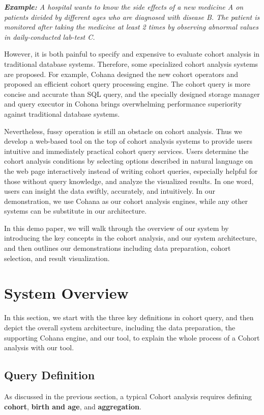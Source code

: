 \documentclass[10pt,conference,letterpaper]{IEEEtran}
\begin{document}
\emph{\textbf{Example:} A hospital wants to know the side effects of a new medicine A on patients divided by different ages who are diagnosed with disease B. The patient is monitored after taking the medicine at least 2 times by observing abnormal values in daily-conducted lab-test C.}

However, it is both painful to specify and expensive to evaluate cohort analysis in traditional database systems. Therefore, some specialized cohort analysis systems are proposed. For example, Cohana\cite{jiang2016cohort} designed the new cohort operators and proposed an efficient cohort query processing engine. The cohort query is more concise and accurate than SQL query, and the specially designed storage manager and query executor in Cohona brings overwhelming performance superiority against traditional database systems. 

Nevertheless, fussy operation is still an obstacle on cohort analysis. Thus we develop a web-based tool on the top of cohort analysis systems to provide users intuitive and immediately practical cohort query services. Users determine the cohort analysis conditions by selecting options described in natural language on the web page interactively instead of writing cohort queries, especially helpful for those without query knowledge, and analyze the visualized results. In one word, users can insight the data swiftly, accurately, and intuitively. In our demonstration, we use Cohana as our cohort analysis engines, while any other systems can be substitute in our architecture. 

In this demo paper, we will walk through the overview of our system by introducing the key concepts in the cohort analysis, and our system architecture, and then outlines our demonstrations including data preparation, cohort selection, and result visualization.

\section{System Overview}
In this section, we start with the three key definitions in cohort query, and then depict the overall system architecture, including the data preparation, the supporting Cohana engine, and our tool, to explain the whole process of a Cohort analysis with our tool.  

\subsection{Query Definition}
As discussed in the previous section, a typical Cohort analysis requires defining \textbf{cohort}, \textbf{birth and age}, and \textbf{aggregation}. 
\end{document}
